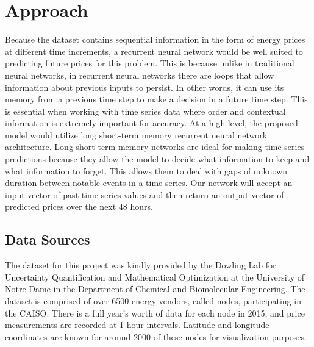 \documentclass[sigconf]{acmart}
\begin{document}

\section{Approach}
Because the dataset contains sequential information in the form of energy prices at different time increments, a recurrent neural network would be well suited to predicting future prices for this problem. This is because unlike in traditional neural networks, in recurrent neural networks there are loops that allow information about previous inputs to persist. In other words, it can use its memory from a previous time step to make a decision in a future time step. This is essential when working with time series data where order and contextual information is extremely important for accuracy.
At a high level, the proposed model would utilize long short-term memory recurrent neural network architecture. Long short-term memory networks are ideal for making time series predictions because they allow the model to decide what information to keep and what information to forget. This allows them to deal with gaps of unknown duration between notable events in a time series.
Our network will accept an input vector of past time series values and then return an output vector of predicted prices over the next 48 hours. 



\subsection{Data Sources}
The dataset for this project was kindly provided by the Dowling Lab for Uncertainty Quantification and Mathematical Optimization at the University of Notre Dame in the Department of Chemical and Biomolecular Engineering. The dataset is comprised of over 6500 energy vendors, called nodes, participating in the CAISO. There is a full year's worth of data for each node in 2015, and price measurements are recorded at 1 hour intervals. Latitude and longitude coordinates are known for around 2000 of these nodes for visualization purposes.
\end{document}
